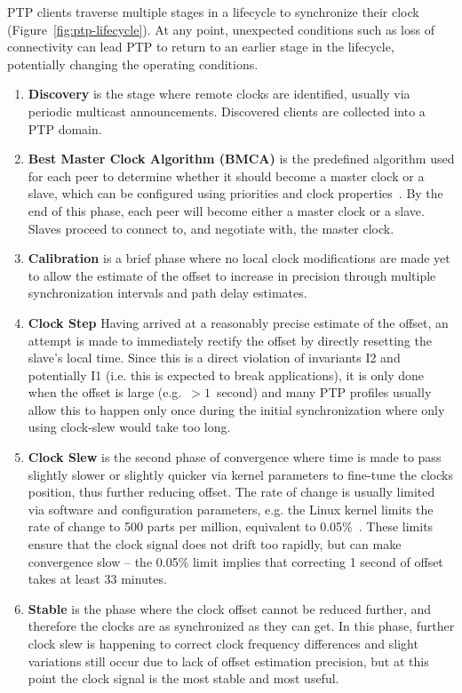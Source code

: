 PTP clients traverse multiple stages in a lifecycle to synchronize their clock (Figure~\ref{fig:ptp-lifecycle}). At any point, unexpected conditions such as loss of connectivity can lead PTP to return to an earlier stage in the lifecycle, potentially changing the operating conditions.

\begin{enumerate}[label=S\arabic*.]
    \item \textbf{Discovery} is the stage where remote clocks are identified, usually via periodic multicast announcements. Discovered clients are collected into a PTP domain.
    \item \textbf{Best Master Clock Algorithm (BMCA)} is the predefined algorithm used for each peer to determine whether it should become a master clock or a slave, which can be configured using priorities and clock properties~\cite{bmca-deep-dive}. By the end of this phase, each peer will become either a master clock or a slave. Slaves proceed to connect to, and negotiate with, the master clock.
    \item \textbf{Calibration} is a brief phase where no local clock modifications are made yet to allow the estimate of the offset to increase in precision through multiple synchronization intervals and path delay estimates.
    \item \textbf{Clock Step} Having arrived at a reasonably precise estimate of the offset, an attempt is made to immediately rectify the offset by directly resetting the slave's local time. Since this is a direct violation of invariants I2 and potentially I1 (i.e. this is expected to break applications), it is only done when the offset is large (e.g.~$>1$~second) and many PTP profiles usually allow this to happen only once during the initial synchronization where only using clock-slew would take too long.
    \item \textbf{Clock Slew} is the second phase of convergence where time is made to pass slightly slower or slightly quicker via kernel parameters to fine-tune the clocks position, thus further reducing offset. The rate of change is usually limited via software and configuration parameters, e.g. the Linux kernel limits the rate of change to 500 parts per million, equivalent to 0.05\%~\cite{adjtimex}. These limits ensure that the clock signal does not drift too rapidly, but can make convergence slow -- the 0.05\% limit implies that correcting 1 second of offset takes at least 33 minutes.
    \item \textbf{Stable} is the phase where the clock offset cannot be reduced further, and therefore the clocks are as synchronized as they can get. In this phase, further clock slew is happening to correct clock frequency differences and slight variations still occur due to lack of offset estimation precision, but at this point the clock signal is the most stable and most useful.
\end{enumerate}

